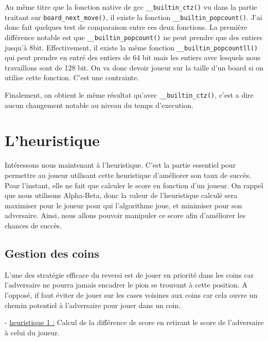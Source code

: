 \documentclass{report}
\begin{document}
Au même titre que la fonction native de gcc \texttt{\_\_builtin\_ctz()} vu dans la partie traitant sur \texttt{board\_next\_move()}, il existe la fonction \newline\texttt{\_\_builtin\_popcount()}.
J'ai donc fait quelques test de comparaison entre ces deux fonctions. La première différence notable est que \texttt{\_\_builtin\_popcount()} ne peut prendre que des entiers jusqu’à 8bit. Effectivement, il existe la même fonction \texttt{\_\_builtin\_popcountll()} qui peut prendre en entré des entiers de 64 bit mais les entiers avec lesquels nous travaillons sont de 128 bit. On va donc devoir joueur sur la taille d’un board si on utilise cette fonction. C’est une contrainte.

Finalement, on obtient le même résultat qu'avec \texttt{\_\_builtin\_ctz()}, c'est a dire aucun changement notable au niveau du temps d'execution.
\section{L'heuristique}

Intéressons nous maintenant à l'heuristique. C'est la partie essentiel pour permettre au joueur utilisant cette heuristique d'améliorer son taux de succès. Pour l'instant, elle ne fait que calculer le score en fonction d'un joueur. On rappel que nous utilisons Alpha-Beta, donc la valeur de l'heuristique calculé sera maximiser pour le joueur pour qui l'algorithme joue, et minimiser pour son adversaire. Ainsi, nous allons pouvoir manipuler ce score afin d'améliorer les chances de succès.

\subsection{Gestion des coins}
L'une des stratégie efficace du reversi est de jouer en priorité dans les coins car l'adversaire ne pourra jamais encadrer le pion se trouvant à cette position. A l'opposé, if faut éviter de jouer sur les cases voisines aux coins car cela ouvre un chemin potentiel à l'adversaire pour jouer dans un coin.
\newline

- \underline{heuristique 1 :} Calcul de la différence de score en retirant le score de l'adversaire à celui du joueur.\newline
\end{document}
